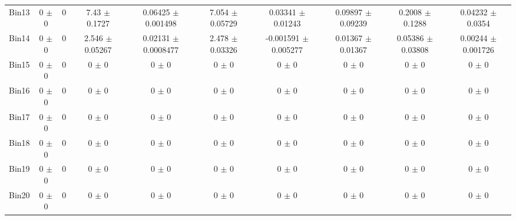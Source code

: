 \begin{tabular}{@{\extracolsep{4pt}}lccccccccc@{}}
     Bin13 & 0 $\pm$ 0 & 0 & 7.43 $\pm$ 0.1727 & 0.06425 $\pm$ 0.001498 & 7.054 $\pm$ 0.05729 & 0.03341 $\pm$ 0.01243 & 0.09897 $\pm$ 0.09239 & 0.2008 $\pm$ 0.1288 & 0.04232 $\pm$ 0.0354 \\ 
     Bin14 & 0 $\pm$ 0 & 0 & 2.546 $\pm$ 0.05267 & 0.02131 $\pm$ 0.0008477 & 2.478 $\pm$ 0.03326 & -0.001591 $\pm$ 0.005277 & 0.01367 $\pm$ 0.01367 & 0.05386 $\pm$ 0.03808 & 0.00244 $\pm$ 0.001726 \\ 
     Bin15 & 0 $\pm$ 0 & 0 & 0 $\pm$ 0 & 0 $\pm$ 0 & 0 $\pm$ 0 & 0 $\pm$ 0 & 0 $\pm$ 0 & 0 $\pm$ 0 & 0 $\pm$ 0 \\ 
     Bin16 & 0 $\pm$ 0 & 0 & 0 $\pm$ 0 & 0 $\pm$ 0 & 0 $\pm$ 0 & 0 $\pm$ 0 & 0 $\pm$ 0 & 0 $\pm$ 0 & 0 $\pm$ 0 \\ 
     Bin17 & 0 $\pm$ 0 & 0 & 0 $\pm$ 0 & 0 $\pm$ 0 & 0 $\pm$ 0 & 0 $\pm$ 0 & 0 $\pm$ 0 & 0 $\pm$ 0 & 0 $\pm$ 0 \\ 
     Bin18 & 0 $\pm$ 0 & 0 & 0 $\pm$ 0 & 0 $\pm$ 0 & 0 $\pm$ 0 & 0 $\pm$ 0 & 0 $\pm$ 0 & 0 $\pm$ 0 & 0 $\pm$ 0 \\ 
     Bin19 & 0 $\pm$ 0 & 0 & 0 $\pm$ 0 & 0 $\pm$ 0 & 0 $\pm$ 0 & 0 $\pm$ 0 & 0 $\pm$ 0 & 0 $\pm$ 0 & 0 $\pm$ 0 \\ 
     Bin20 & 0 $\pm$ 0 & 0 & 0 $\pm$ 0 & 0 $\pm$ 0 & 0 $\pm$ 0 & 0 $\pm$ 0 & 0 $\pm$ 0 & 0 $\pm$ 0 & 0 $\pm$ 0 \\ 
\hline\hline
  \end{tabular}
